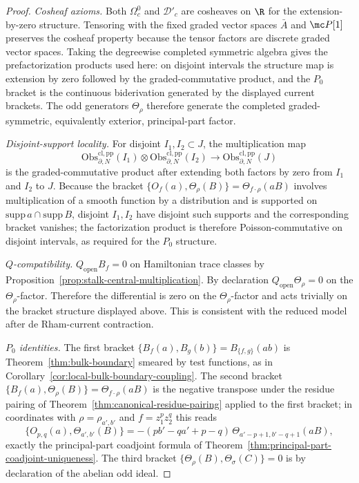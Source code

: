 \documentclass[11pt]{memoir}
\begin{document}
\begin{proof}
	  \emph{Cosheaf axioms.} Both \(\Omega_c^0\) and $\mathcal D'_c$ are
  cosheaves on $\R$ for the extension-by-zero structure. Tensoring with
  the fixed graded vector spaces $\bar A$ and $\mc P[1]$ preserves the
  cosheaf property because the tensor factors are discrete graded
  vector spaces. Taking the degreewise completed symmetric algebra gives
  the prefactorization products used here: on disjoint intervals the
  structure map is extension by zero followed by the graded-commutative
  product, and the \(P_0\) bracket is the continuous biderivation
  generated by the displayed current brackets. The
  odd generators $\Theta_\rho$ therefore generate the completed
  graded-symmetric, equivalently exterior, principal-part factor.

	  \emph{Disjoint-support locality.} For disjoint \(I_1,I_2\subset J\), the
	  multiplication map
	  $$\mathrm{Obs}_{\partial,N}^{\mathrm{cl,pp}}(I_1)\otimes
	    \mathrm{Obs}_{\partial,N}^{\mathrm{cl,pp}}(I_2)\longrightarrow
	    \mathrm{Obs}_{\partial,N}^{\mathrm{cl,pp}}(J)$$
	  is the graded-commutative product after extending both factors by zero
	  from \(I_1\) and \(I_2\) to \(J\).  Because the bracket
	  $\{O_f(a),\Theta_\rho(B)\}=\Theta_{f\cdot\rho}(aB)$ involves
  multiplication of a smooth function by a distribution and is
  supported on $\mathrm{supp}\,a\cap\mathrm{supp}\,B$, disjoint
  $I_1,I_2$ have disjoint such supports and the corresponding bracket
  vanishes; the factorization product is therefore
  Poisson-commutative on disjoint intervals, as required for the $P_0$
  structure.

  \emph{$Q$-compatibility.} $Q_{\mathrm{open}}B_f=0$ on Hamiltonian
  trace classes by Proposition~\ref{prop:stalk-central-multiplication}.
  By declaration $Q_{\mathrm{open}}\Theta_\rho=0$ on the
  $\Theta_\rho$-factor. Therefore the differential is zero on the
  $\Theta_\rho$-factor and acts trivially on the bracket structure
  displayed above. This is consistent with the reduced model after
  de Rham-current contraction.

  \emph{$P_0$ identities.} The first bracket
  $\{B_f(a),B_g(b)\}=B_{\{f,g\}}(ab)$ is Theorem~\ref{thm:bulk-boundary}
  smeared by test functions, as in
  Corollary~\ref{cor:local-bulk-boundary-coupling}. The second bracket
  $\{B_f(a),\Theta_\rho(B)\}=\Theta_{f\cdot\rho}(aB)$ is the negative
  transpose under the residue pairing of
  Theorem~\ref{thm:canonical-residue-pairing} applied to the first
  bracket; in coordinates with $\rho=\rho_{a',b'}$ and
  $f=z_1^pz_2^q$ this reads
  $$\{O_{p,q}(a),\Theta_{a',b'}(B)\}
    =-(pb'-qa'+p-q)\,\Theta_{a'-p+1,b'-q+1}(aB),$$
  exactly the principal-part coadjoint formula of
  Theorem~\ref{thm:principal-part-coadjoint-uniqueness}. The third
  bracket $\{\Theta_\rho(B),\Theta_\sigma(C)\}=0$ is by declaration of
  the abelian odd ideal.


\end{proof}
\end{document}
